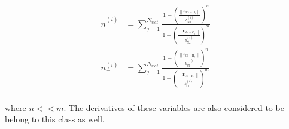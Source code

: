 \begin{spacing}{2.0}
    \begin{equation}\begin{aligned}
        n_+^{(i)} &= \sum_{j=1}^{N_{wat}} \frac{1-\left(\frac{\left\lVert\mathbf{r}_{\mathrm{Na-O}_j}\right\rVert}{b_{\mathrm{Na}}^{(i)}}\right)^n}
            {1-\left(\frac{\left\lVert\mathbf{r}_{\mathrm{Na-O}_j}\right\rVert}{b_{\mathrm{Na}}^{(i)}}\right)^m} \\
        n_-^{(i)} &= \sum_{j=1}^{N_{wat}} \frac{1-\left(\frac{\left\lVert\mathbf{r}_{\mathrm{Cl-H}_j}\right\rVert}{b_{\mathrm{Cl}}^{(i)}}\right)^n}
            {1-\left(\frac{\left\lVert\mathbf{r}_{\mathrm{Cl-H}_j}\right\rVert}{b_{\mathrm{Cl}}^{(i)}}\right)^m} \\
    \end{aligned}\end{equation}

    \noindent where $n << m$. The derivatives of these variables are also considered to be belong to this class as well.
\end{spacing}
